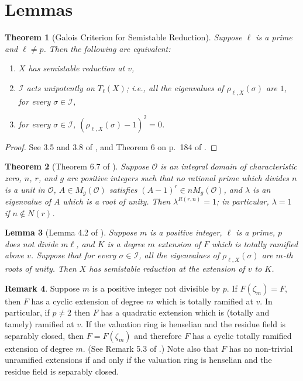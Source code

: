 \documentclass{amsart}
\def\I{{\mathcal I}}
\def\O{{\mathcal O}}
\newtheorem{thm}{Theorem}[section]
\newtheorem{lem}[thm]{Lemma}
\theoremstyle{definition}
\newtheorem{rem}[thm]{Remark}
\begin{document}
\section{Lemmas}

\begin{thm}[Galois Criterion for Semistable Reduction]
\label{galcrit}
Suppose $\ell$ is a prime and $\ell \ne p$. Then the
following are equivalent:
\begin{enumerate}
\item[(i)] $X$ has semistable reduction at $v$,
\item[(ii)] $\I$ acts unipotently on $T_\ell(X)$; i.e.,
all the eigenvalues of $\rho_{\ell,X}(\sigma)$ are $1$, 
for every $\sigma \in \I$,
\item[(iii)] for every $\sigma \in \I$, 
$(\rho_{\ell,X}(\sigma) - 1)^2 = 0$.
\end{enumerate}
\end{thm}

\begin{proof}
See 3.5 and 3.8 of \cite{SGA7}, 
and Theorem 6 on p.~184 of \cite{BLR}.
\end{proof}

\begin{thm}[Theorem 6.7 of \cite{serrelem}]
\label{localglobal}
Suppose $\O$ is an integral domain of characteristic zero,
$n$, $r$, and $g$ are positive integers 
such that no rational prime which divides $n$ is a unit in $\O$,
$A \in M_g(\O)$ satisfies $(A - 1)^r \in nM_g(\O)$, and $\lambda$ is
an eigenvalue of $A$ which is a root of unity.
Then $\lambda^{R(r,n)} = 1$; in particular, $\lambda = 1$ if 
$n \notin N(r)$.
\end{thm}

\begin{lem}[Lemma 4.2 of \cite{degree}]
\label{mevals}
Suppose $m$ is a positive integer, $\ell$ is a prime,
$p$ does not divide $m\ell$, and
$K$ is a degree $m$ extension of $F$
which is totally ramified above $v$. 
Suppose that for every $\sigma \in \I$,
all the eigenvalues of $\rho_{\ell,X}(\sigma)$ 
are $m$-th roots of unity. Then $X$ has
semistable reduction at the extension of $v$ to $K$.
\end{lem}

\begin{rem}
\label{ramifiedcyclic}
Suppose $m$ is a positive
integer not divisible by $p$. If $F(\zeta_m) = F$,
then $F$ has a cyclic extension of degree $m$ which is totally ramified at
$v$. In particular, if $p \ne 2$ then 
$F$ has a quadratic extension which is (totally and tamely) ramified at $v$.
If the valuation ring is henselian and the residue field is separably closed, 
then $F= F(\zeta_m)$ and therefore $F$ has a cyclic totally ramified extension 
of degree $m$. (See Remark 5.3 of \cite{semistab}.)
Note also that $F$ has no non-trivial unramified extensions if and only if 
the valuation ring is henselian and the residue field is separably closed.
\end{rem}
\end{document}
